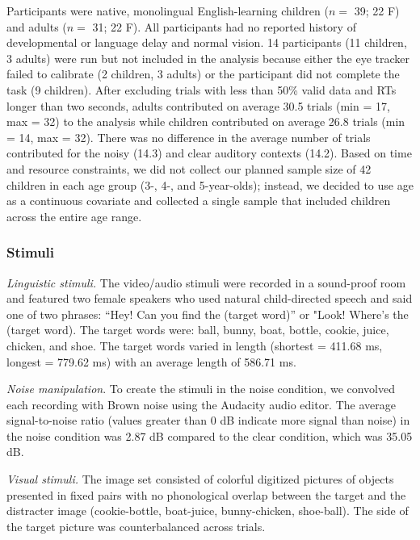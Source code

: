 \documentclass[,man,floatsintext]{apa6}
\begin{document}
Participants were native, monolingual English-learning children (\(n=\) 39; 22 F) and adults (\(n=\) 31; 22 F). All participants had no reported history of developmental or language delay and normal vision. 14 participants (11 children, 3 adults) were run but not included in the analysis because either the eye tracker failed to calibrate (2 children, 3 adults) or the participant did not complete the task (9 children). After excluding trials with less than 50\% valid data and RTs longer than two seconds, adults contributed on average 30.5 trials (min = 17, max = 32) to the analysis while children contributed on average 26.8 trials (min = 14, max = 32). There was no difference in the average number of trials contributed for the noisy (14.3) and clear auditory contexts (14.2). Based on time and resource constraints, we did not collect our planned sample size of 42 children in each age group (3-, 4-, and 5-year-olds); instead, we decided to use age as a continuous covariate and collected a single sample that included children across the entire age range.

\hypertarget{stimuli-1}{%
\subsubsection{Stimuli}\label{stimuli-1}}

\emph{Linguistic stimuli.} The video/audio stimuli were recorded in a sound-proof room and featured two female speakers who used natural child-directed speech and said one of two phrases: \enquote{Hey! Can you find the (target word)} or "Look! Where's the (target word). The target words were: ball, bunny, boat, bottle, cookie, juice, chicken, and shoe. The target words varied in length (shortest = 411.68 ms, longest = 779.62 ms) with an average length of 586.71 ms.

\emph{Noise manipulation}. To create the stimuli in the noise condition, we convolved each recording with Brown noise using the Audacity audio editor. The average signal-to-noise ratio (values greater than 0 dB indicate more signal than noise) in the noise condition was 2.87 dB compared to the clear condition, which was 35.05 dB.

\emph{Visual stimuli.} The image set consisted of colorful digitized pictures of objects presented in fixed pairs with no phonological overlap between the target and the distracter image (cookie-bottle, boat-juice, bunny-chicken, shoe-ball). The side of the target picture was counterbalanced across trials.
\end{document}
